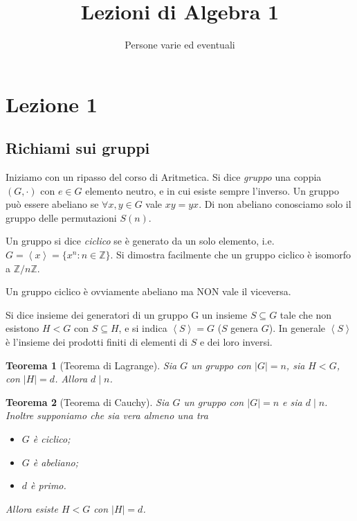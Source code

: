 \documentclass[a4paper,10pt,oneside]{article}
\title{Lezioni di Algebra 1}
\author{Persone varie ed eventuali}
\date{}
\newcommand{\myname}[1]{\emph{#1}}
\newcommand{\abs}[1]{\left|#1\right|} %
\newcommand{\gen}[1]{\left\langle#1\right\rangle} %
\theoremstyle{plain}
\newtheorem{mytheorem}{Teorema}[section]
\theoremstyle{definition}
\theoremstyle{remark}
\begin{document}
\maketitle

\cleardoublepage	
  \section{Lezione 1}
    \subsection{Richiami sui gruppi}
      Iniziamo con un ripasso del corso di Aritmetica. Si dice \myname{gruppo} una coppia $(G,\cdot)$ con $e \in G$ elemento neutro, e in cui esiste sempre l'inverso. Un gruppo può essere abeliano se $\forall x,y\in G$ vale $xy=yx$. Di non abeliano conosciamo solo il gruppo delle permutazioni $S(n)$.
      
      Un gruppo si dice \myname{ciclico} se è generato da un solo elemento, i.e. $G = \gen x = \{x^n: n\in \mathbb Z\}$. Si dimostra facilmente che un gruppo ciclico è isomorfo a $\mathbb Z/n\mathbb Z$.
      
      Un gruppo ciclico è ovviamente abeliano ma NON vale il viceversa.
      
      Si dice insieme dei generatori di un gruppo G un insieme $S\subseteq G$ tale che non esistono $H<G$ con $S\subseteq H$, e si indica $\gen S =G$ ($S$ genera $G$). In generale $\gen S$ è l'insieme dei prodotti finiti di elementi di $S$ e dei loro inversi.
      
      \begin{mytheorem}[Teorema di Lagrange]
	Sia $G$ un gruppo con $\abs G = n$, sia $H<G$, con $\abs H = d$. Allora $d\mid n$.
      \end{mytheorem}
      
      \begin{mytheorem}[Teorema di Cauchy]
	Sia $G$ un gruppo con $\abs G = n$ e sia $d\mid n$. Inoltre supponiamo che sia vera almeno una tra
	\begin{itemize}
	  \item $G$ è ciclico;
	  \item $G$ è abeliano;
	  \item $d$ è primo.
	\end{itemize}
	
	Allora esiste $H<G$ con $\abs H=d$.
      \end{mytheorem}
      
      
\end{document}
